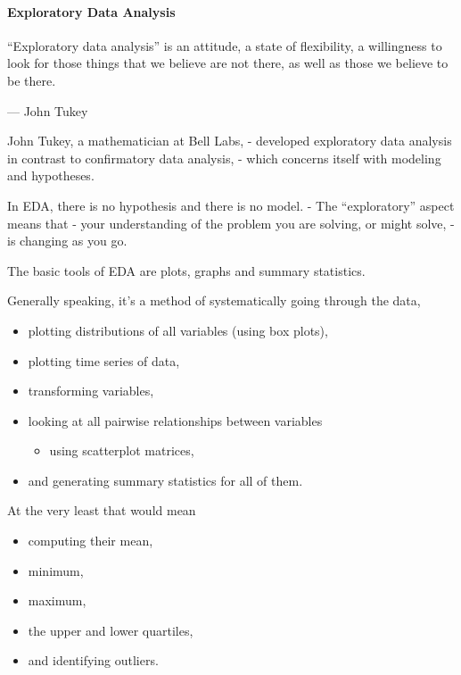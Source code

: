 \documentclass[]{article}
\providecommand{\tightlist}{%
  \setlength{\itemsep}{0pt}\setlength{\parskip}{0pt}}
\let\oldparagraph\paragraph
\renewcommand{\paragraph}[1]{\oldparagraph{#1}\mbox{}}
\begin{document}
\paragraph{Exploratory Data Analysis}\label{exploratory-data-analysis}

``Exploratory data analysis'' is an attitude, a state of flexibility, a
willingness to look for those things that we believe are not there, as
well as those we believe to be there.

--- John Tukey

John Tukey, a mathematician at Bell Labs, - developed exploratory data
analysis in contrast to confirmatory data analysis, - which concerns
itself with modeling and hypotheses.

In EDA, there is no hypothesis and there is no model. - The
``exploratory'' aspect means that - your understanding of the problem
you are solving, or might solve, - is changing as you go.

The basic tools of EDA are plots, graphs and summary statistics.

Generally speaking, it's a method of systematically going through the
data,

\begin{itemize}
\tightlist
\item
  plotting distributions of all variables (using box plots),
\item
  plotting time series of data,
\item
  transforming variables,
\item
  looking at all pairwise relationships between variables

  \begin{itemize}
  \tightlist
  \item
    using scatterplot matrices,
  \end{itemize}
\item
  and generating summary statistics for all of them.
\end{itemize}

At the very least that would mean

\begin{itemize}
\tightlist
\item
  computing their mean,
\item
  minimum,
\item
  maximum,
\item
  the upper and lower quartiles,
\item
  and identifying outliers.
\end{itemize}
\end{document}
